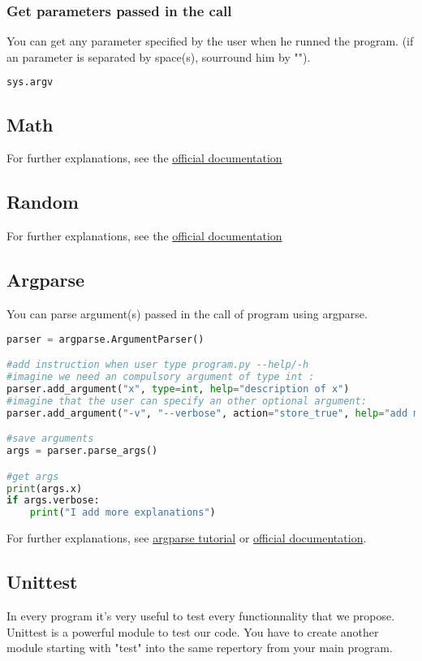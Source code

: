 \documentclass[a4paper, 12pt, titlepage]{scrartcl} %
\begin{document}
\subsubsection{Get parameters passed in the call}
You can get any parameter specified by the user when he runned the program. (if an parameter is separated by space(s), sourround him by "").
\begin{lstlisting}[language=Python]
sys.argv
\end{lstlisting} \vspace{5mm}

\subsection{Math}
For further explanations, see the \href{https://docs.python.org/3/library/math.html}{official documentation}

\subsection{Random}
For further explanations, see the \href{https://docs.python.org/3/library/random.html}{official documentation}

\subsection{Argparse}
You can parse argument(s) passed in the call of program using argparse.
\begin{lstlisting}[language=Python]
parser = argparse.ArgumentParser()

#add instruction when user type program.py --help/-h
#imagine we need an compulsory argument of type int :
parser.add_argument("x", type=int, help="description of x")
#imagine that the user can specify an other optional argument:
parser.add_argument("-v", "--verbose", action="store_true", help="add more explanation")

#save arguments
args = parser.parse_args()

#get args
print(args.x)
if args.verbose:
    print("I add more explanations")
\end{lstlisting} \vspace{5mm}
For further explanations, see \href{http://www.sharelatex.com}{argparse tutorial} or  \href{https://docs.python.org/3/library/argparse.html}{official documentation}.


\subsection{Unittest}
In every program it's very useful to test every functionnality that we propose. Unittest is a powerful module to test our code. You have to create another module starting with "test" into the same repertory from your main program.
\end{document}
